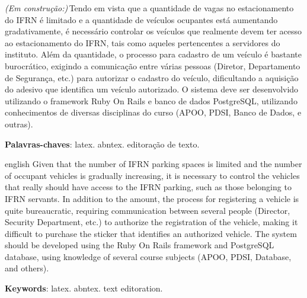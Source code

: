 
\setlength{\absparsep}{18pt} %
\begin{resumo}
\emph{(Em construção:)}\,Tendo em vista que a quantidade de vagas no estacionamento do IFRN é limitado e a quantidade de veículos ocupantes está aumentando gradativamente, é necessário controlar os veículos que realmente devem ter acesso ao estacionamento do IFRN, tais como aqueles pertencentes a servidores do instituto. Além da quantidade, o processo para cadastro de um veículo é bastante burocrático, exigindo a comunicação entre várias pessoas (Diretor, Departamento de Segurança, etc.) para autorizar o cadastro do veículo, dificultando a aquisição do adesivo que identifica um veículo autorizado. O sistema deve ser desenvolvido utilizando o framework Ruby On Rails e banco de dados PostgreSQL, utilizando conhecimentos de diversas disciplinas do curso (APOO, PDSI, Banco de Dados, e outras).

 \textbf{Palavras-chaves}: latex. abntex. editoração de texto.
\end{resumo}

\begin{resumo}[Abstract]
 \begin{otherlanguage*}{english}
   Given that the number of IFRN parking spaces is limited and the number of occupant vehicles is gradually increasing, it is necessary to control the vehicles that really should have access to the IFRN parking, such as those belonging to IFRN servants. In addition to the amount, the process for registering a vehicle is quite bureaucratic, requiring communication between several people (Director, Security Department, etc.) to authorize the registration of the vehicle, making it difficult to purchase the sticker that identifies an authorized vehicle. The system should be developed using the Ruby On Rails framework and PostgreSQL database, using knowledge of several course subjects (APOO, PDSI, Database, and others).

   \vspace{\onelineskip}
 
   \noindent 
   \textbf{Keywords}: latex. abntex. text editoration.
 \end{otherlanguage*}
\end{resumo}